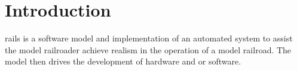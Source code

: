\chapter{Introduction}
\gls{rails} is a software model and implementation of an automated system to assist the model railroader achieve realism in the operation of a model railroad. The model then drives the development of hardware and or software.
\begingroup
  \let\origchapter\chapter
  \let\origsection\section
  \let\origsubsection\subsection

  \renewcommand{\chapter}[1]{\origsection{#1}}
  \renewcommand{\section}[1]{\origsubsection{#1}}
  \renewcommand{\subsection}[1]{\origsubsubsection{#1}}

  

\endgroup
